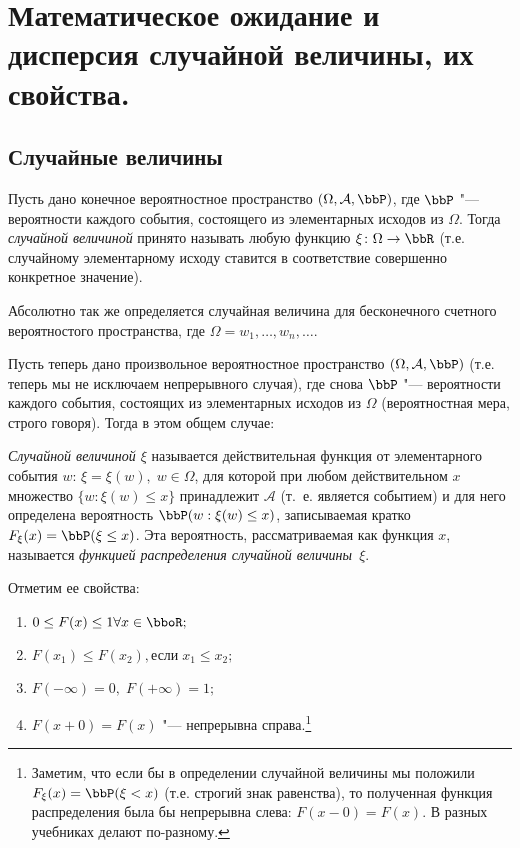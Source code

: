 \chapter{Математическое ожидание и дисперсия случайной величины, их свойства.}
\section{Случайные величины}

Пусть дано конечное вероятностное пространство $(\Omega,\mathcal A, \bbP)$, где $\bbP$ "--- вероятности каждого события, состоящего из элементарных исходов из $\Omega$. Тогда \textit{случайной величиной} принято называть любую функцию $\xi\colon \Omega \to \bbR$ (т.е. случайному элементарному исходу ставится в соответствие совершенно конкретное значение).

Абсолютно так же определяется случайная величина для бесконечного счетного вероятностого пространства, где $\Omega = {w_1,\dots, w_n,\dots}$.

Пусть теперь дано произвольное вероятностное пространство $(\Omega,\mathcal A, \bbP)$ (т.е. теперь мы не исключаем непрерывного случая), где снова $\bbP$ "--- вероятности каждого события, состоящих из элементарных исходов из $\Omega$ (вероятностная мера, строго говоря). Тогда в этом общем случае:
\begin{defn}
\textit{Случайной величиной $\xi$} называется действительная функция от элементарного события $w$: $\xi = \xi(w), \; w\in\Omega$, для которой при любом действительном $x$ множество $\{w: \xi(w) \le x\}$ принадлежит $\mathcal A$ (т.~е. является событием) и для него определена вероятность $\bbP(w: \xi(w) \le x)$, записываемая кратко $F_\xi(x)=\bbP(\xi \le x)$. Эта вероятность, рассматриваемая как функция $x$, называется \textit{функцией распределения случайной величины~$\xi$}.
\end{defn}
Отметим ее свойства:
\begin{enumerate}
\item 
$0 \le F(x) \le 1 \forall x \in \bboR;$ 
\item
$F(x_1) \le F(x_2), \text{если}\; x_1\le x_2;$
\item
$F(-\infty)=0, \; F(+\infty)=1;$
\item
$F(x+0)=F(x)$ "--- непрерывна справа.\footnote{Заметим, что если бы в определении случайной величины мы положили $F_\xi(x)=\bbP(\xi < x)$ (т.е. строгий знак равенства), то полученная функция распределения была бы непрерывна слева: $F(x-0)=F(x)$. В разных учебниках делают по-разному.}
\end{enumerate}

